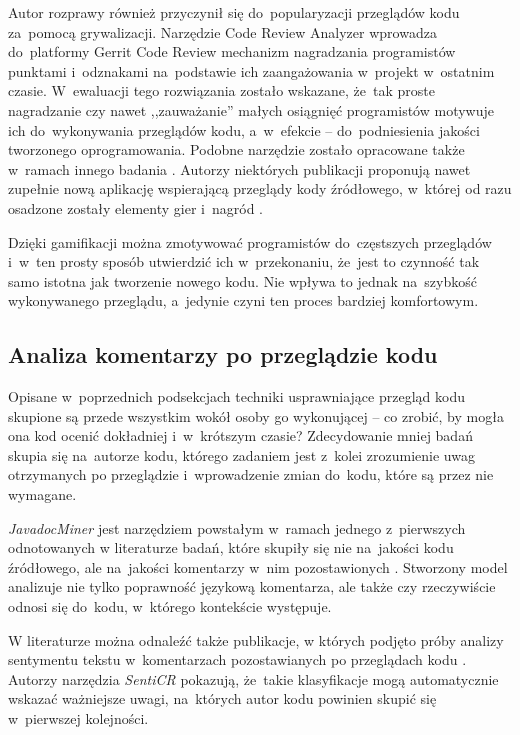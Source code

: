 \documentclass[twoside]{praca}
\begin{document}
Autor rozprawy również przyczynił się do~popularyzacji przeglądów kodu za~pomocą grywalizacji. Narzędzie Code Review Analyzer \cite{fracz2018developers} wprowadza do~platformy Gerrit Code Review \cite{Milanesio2013} mechanizm nagradzania programistów punktami i~odznakami na~podstawie ich zaangażowania w~projekt w~ostatnim czasie. W~ewaluacji tego rozwiązania zostało wskazane, że~tak proste nagradzanie czy nawet ,,zauważanie'' małych osiągnięć programistów motywuje ich do~wykonywania przeglądów kodu, a~w~efekcie -- do~podniesienia jakości tworzonego oprogramowania. Podobne narzędzie zostało opracowane także w~ramach innego badania \cite{unkelos2015gamifying}. Autorzy niektórych publikacji proponują nawet zupełnie nową aplikację wspierającą przeglądy kody źródłowego, w~której od razu osadzone zostały elementy gier i~nagród \cite{khandelwal2017impact}.

Dzięki gamifikacji można zmotywować programistów do~częstszych przeglądów i~w~ten prosty sposób utwierdzić ich w~przekonaniu, że~jest to czynność tak samo istotna jak tworzenie nowego kodu. Nie wpływa to jednak na~szybkość wykonywanego przeglądu, a~jedynie czyni ten proces bardziej komfortowym.

\subsection{Analiza komentarzy po przeglądzie kodu}

Opisane w~poprzednich podsekcjach techniki usprawniające przegląd kodu skupione są przede wszystkim wokół osoby go wykonującej -- co zrobić, by mogła ona kod ocenić dokładniej i~w~krótszym czasie? Zdecydowanie mniej badań skupia się na~autorze kodu, którego zadaniem jest z~kolei zrozumienie uwag otrzymanych po przeglądzie i~wprowadzenie zmian do~kodu, które są przez nie wymagane.

\textit{JavadocMiner} jest narzędziem powstałym w~ramach jednego z~pierwszych odnotowanych w literaturze badań, które skupiły się nie na~jakości kodu źródłowego, ale na~jakości komentarzy w~nim pozostawionych \cite{khamis2010automatic}. Stworzony model analizuje nie tylko poprawność językową komentarza, ale także czy rzeczywiście odnosi się do~kodu, w~którego kontekście występuje.

W literaturze można odnaleźć także publikacje, w których podjęto próby analizy sentymentu tekstu w~komentarzach pozostawianych po przeglądach kodu \cite{veenendaal2015sentiment}. Autorzy narzędzia \textit{SentiCR} \cite{ahmed2017senticr} pokazują, że~takie klasyfikacje mogą automatycznie wskazać ważniejsze uwagi, na~których autor kodu powinien skupić się w~pierwszej kolejności.
\end{document}
